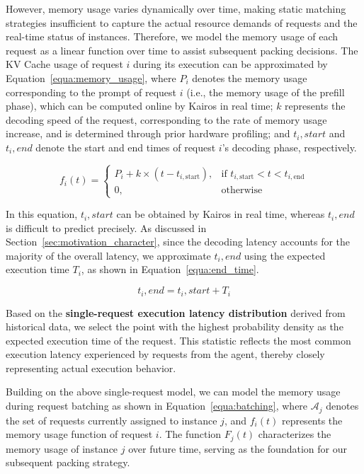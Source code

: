 \documentclass[sigplan,nonacm]{acmart}
\newcommand{\system}{Kairos}
\begin{document}
However, memory usage varies dynamically over time, making static matching strategies insufficient to capture the actual resource demands of requests and the real-time status of instances. Therefore, we model the memory usage of each request as a linear function over time to assist subsequent packing decisions.
The KV Cache usage of request $i$ during its execution can be approximated by Equation~\ref{equa:memory_usage}, where $P_i$ denotes the memory usage corresponding to the prompt of request $i$ (i.e., the memory usage of the prefill phase), which can be computed online by \system{} in real time; $k$ represents the decoding speed of the request, corresponding to the rate of memory usage increase, and is determined through prior hardware profiling; and $t_i,start$ and $t_i,end$ denote the start and end times of request $i$’s decoding phase, respectively.


\vspace{-4mm}
\begin{equation}
\label{equa:memory_usage}
f_i(t) = 
\begin{cases}
P_i + k \times (t - t_{i,\text{start}}), & \text{if } t_{i,\text{start}} < t < t_{i,\text{end}} \\[2pt]
0, & \text{otherwise}
\end{cases}
\end{equation}

In this equation, $t_i,start$ can be obtained by \system{} in real time, whereas $t_i,end$ is difficult to predict precisely. As discussed in Section~\ref{sec:motivation_character}, since the decoding latency accounts for the majority of the overall latency, we approximate $t_i,end$ using the expected execution time $T_i$, as shown in Equation~\ref{equa:end_time}.


\vspace{-3.5mm}
\begin{equation}
\label{equa:end_time}
t_i,end = t_i,start + T_i
\end{equation}

Based on the \textbf{single-request execution latency distribution} derived from historical data, we select the point with the highest probability density as the expected execution time of the request. This statistic reflects the most common execution latency experienced by requests from the agent, thereby closely representing actual execution behavior.

Building on the above single-request model, we can model the memory usage during request batching as shown in Equation~\ref{equa:batching}, where $\mathcal{A}_j$ denotes the set of requests currently assigned to instance $j$, and $f_i(t)$ represents the memory usage function of request $i$. The function $F_j(t)$ characterizes the memory usage of instance $j$ over future time, serving as the foundation for our subsequent packing strategy.
\end{document}
